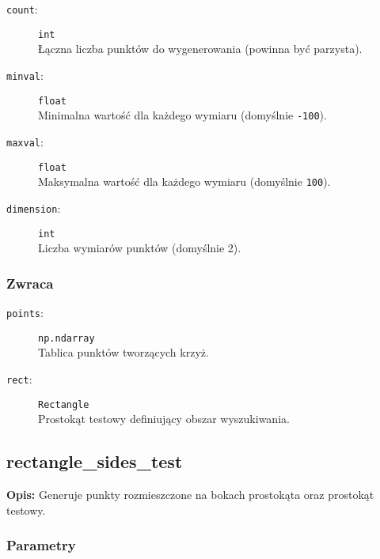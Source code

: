 \documentclass[12pt]{article}
\begin{document}
\begin{description}
    \item[\texttt{count}:] \texttt{int} \\
    Łączna liczba punktów do wygenerowania (powinna być parzysta).
    
    \item[\texttt{minval}:] \texttt{float} \\
    Minimalna wartość dla każdego wymiaru (domyślnie \texttt{-100}).
    
    \item[\texttt{maxval}:] \texttt{float} \\
    Maksymalna wartość dla każdego wymiaru (domyślnie \texttt{100}).
    
    \item[\texttt{dimension}:] \texttt{int} \\
    Liczba wymiarów punktów (domyślnie 2).
\end{description}

\subsubsection{Zwraca}

\begin{description}
    \item[\texttt{points}:] \texttt{np.ndarray} \\
    Tablica punktów tworzących krzyż.
    
    \item[\texttt{rect}:] \texttt{Rectangle} \\
    Prostokąt testowy definiujący obszar wyszukiwania.
\end{description}

\subsection{rectangle\_sides\_test}

\textbf{Opis:} Generuje punkty rozmieszczone na bokach prostokąta oraz prostokąt testowy.

\subsubsection{Parametry}
\end{document}
